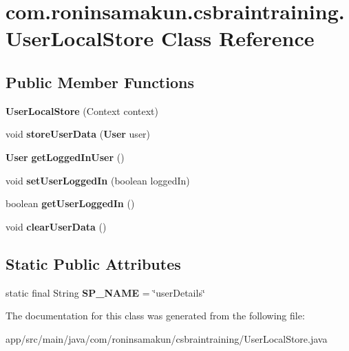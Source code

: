 \section{com.\+roninsamakun.\+csbraintraining.\+User\+Local\+Store Class Reference}
\label{classcom_1_1roninsamakun_1_1csbraintraining_1_1_user_local_store}
\subsection*{Public Member Functions}
\begin{DoxyCompactItemize}
\item 
{\bfseries User\+Local\+Store} (Context context)\label{classcom_1_1roninsamakun_1_1csbraintraining_1_1_user_local_store_a702d7cd7d3e642430cc7d8a968c68e00}

\item 
void {\bfseries store\+User\+Data} ({\bf User} user)\label{classcom_1_1roninsamakun_1_1csbraintraining_1_1_user_local_store_aabf9dce86248c38a0db7816ce86591b5}

\item 
{\bf User} {\bfseries get\+Logged\+In\+User} ()\label{classcom_1_1roninsamakun_1_1csbraintraining_1_1_user_local_store_a31012574e5428a8094b6a2759c53a9b9}

\item 
void {\bfseries set\+User\+Logged\+In} (boolean logged\+In)\label{classcom_1_1roninsamakun_1_1csbraintraining_1_1_user_local_store_a900ceee8921be31d7670e2880f48be1b}

\item 
boolean {\bfseries get\+User\+Logged\+In} ()\label{classcom_1_1roninsamakun_1_1csbraintraining_1_1_user_local_store_a20395733521ebc6eee660c0ecce8c8dc}

\item 
void {\bfseries clear\+User\+Data} ()\label{classcom_1_1roninsamakun_1_1csbraintraining_1_1_user_local_store_a3183d7370590f61949201a473de45863}

\end{DoxyCompactItemize}
\subsection*{Static Public Attributes}
\begin{DoxyCompactItemize}
\item 
static final String {\bfseries S\+P\+\_\+\+N\+A\+M\+E} = \char`\"{}user\+Details\char`\"{}\label{classcom_1_1roninsamakun_1_1csbraintraining_1_1_user_local_store_a55c62d8ce31a8f4894247878b5812331}

\end{DoxyCompactItemize}


The documentation for this class was generated from the following file\+:\begin{DoxyCompactItemize}
\item 
app/src/main/java/com/roninsamakun/csbraintraining/User\+Local\+Store.\+java\end{DoxyCompactItemize}
